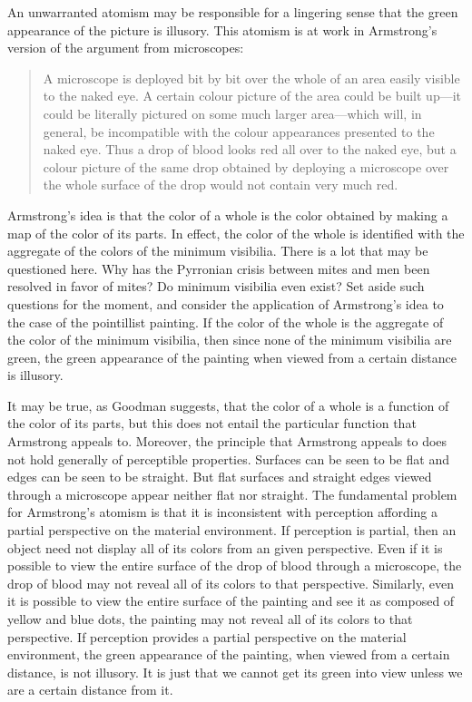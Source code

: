 \documentclass[12pt]{article}
\begin{document}
An unwarranted atomism may be responsible for a lingering sense that the green appearance of the picture is illusory. This atomism is at work in Armstrong's version of the argument from microscopes:
\begin{quote}
	A microscope is deployed bit by bit over the whole of an area easily visible to the naked eye. A certain colour picture of the area could be built up---it could be literally pictured on some much larger area---which will, in general, be incompatible with the colour appearances presented to the naked eye. Thus a drop of blood looks red all over to the naked eye, but a colour picture of the same drop obtained by deploying a microscope over the whole surface of the drop would not contain very much red. \citep[108]{Armstrong:1968nx}
\end{quote}
Armstrong's idea is that the color of a whole is the color obtained by making a map of the color of its parts. In effect, the color of the whole is identified with the aggregate of the colors of the minimum visibilia. There is a lot that may be questioned here. Why has the Pyrronian crisis between mites and men been resolved in favor of mites? Do minimum visibilia even exist? Set aside such questions for the moment, and consider the application of Armstrong's idea to the case of the pointillist painting. If the color of the whole is the aggregate of the color of the minimum visibilia, then since none of the minimum visibilia are green, the green appearance of the painting when viewed from a certain distance is illusory.

It may be true, as Goodman suggests, that the color of a whole is a function of the color of its parts, but this does not entail the particular function that Armstrong appeals to. Moreover, the principle that Armstrong appeals to does not hold generally of perceptible properties. Surfaces can be seen to be flat and edges can be seen to be straight. But flat surfaces and straight edges viewed through a microscope appear neither flat nor straight. The fundamental problem for Armstrong's atomism is that it is inconsistent with perception affording a partial perspective on the material environment. If perception is partial, then an object need not display all of its colors from an given perspective. Even if it is possible to view the entire surface of the drop of blood through a microscope, the drop of blood may not reveal all of its colors to that perspective. Similarly, even it is possible to view the entire surface of the painting and see it as composed of yellow and blue dots, the painting may not reveal all of its colors to that perspective. If perception provides a partial perspective on the material environment, the green appearance of the painting, when viewed from a certain distance, is not illusory. It is just that we cannot get its green into view unless we are a certain distance from it.
\end{document}
